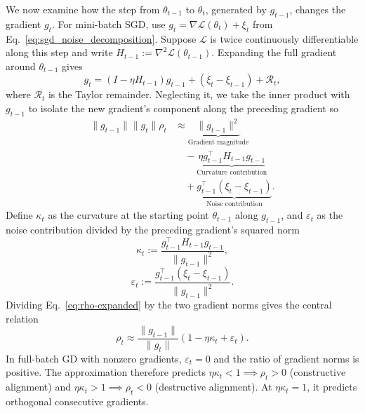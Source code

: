 We now examine how the step from $\theta_{t-1}$ to $\theta_t$, generated by $g_{t-1}$, changes the gradient $g_t$. For mini-batch SGD, use $g_t=\nabla\mathcal L(\theta_t)+\xi_t$ from Eq.~\eqref{eq:sgd_noise_decomposition}. Suppose $\mathcal L$ is twice continuously differentiable along this step and write $H_{t-1}:=\nabla^2\mathcal L(\theta_{t-1})$. Expanding the full gradient around $\theta_{t-1}$ gives
\begin{equation}
  g_t=(I-\eta H_{t-1})g_{t-1}+(\xi_t-\xi_{t-1})+\mathcal R_t,
  \label{eq:gradient-evolution}
\end{equation}
where $\mathcal R_t$ is the Taylor remainder. Neglecting it, we take the inner product with $g_{t-1}$ to isolate the new gradient's component along the preceding gradient so
\begin{equation}
\begin{aligned}
\|g_{t-1}\|\|g_t\|\rho_t
 &\approx\underbrace{\|g_{t-1}\|^2}_{\text{Gradient magnitude}}\\
 &\quad-\underbrace{\eta g_{t-1}^{\top}H_{t-1}g_{t-1}}_{\text{Curvature contribution}}\\
 &\quad+\underbrace{g_{t-1}^{\top}(\xi_t-\xi_{t-1})}_{\text{Noise contribution}}.
\end{aligned}
\label{eq:rho-expanded}
\end{equation}
Define $\kappa_t$ as the curvature at the starting point $\theta_{t-1}$ along $g_{t-1}$, and $\varepsilon_t$ as the noise contribution divided by the preceding gradient's squared norm
\begin{equation}
  \kappa_t:=\frac{g_{t-1}^\top H_{t-1}g_{t-1}}{\|g_{t-1}\|^2},
  \label{eq:kappa}
\end{equation}
\begin{equation}
  \varepsilon_t:=
  \frac{g_{t-1}^\top(\xi_t-\xi_{t-1})}{\|g_{t-1}\|^2}.
  \label{eq:epsilon}
\end{equation}
Dividing Eq.~\eqref{eq:rho-expanded} by the two gradient norms gives the central relation
\begin{equation}
  \boxed{\rho_t\approx\frac{\|g_{t-1}\|}{\|g_t\|}
                   (1-\eta\kappa_t+\varepsilon_t).}
  \label{eq:rho-normalized}
\end{equation}
In full-batch GD with nonzero gradients, $\varepsilon_t=0$ and the ratio of gradient norms is positive. The approximation therefore predicts $\eta\kappa_t<1 \implies \rho_t>0$ (constructive alignment) and $\eta\kappa_t>1 \implies \rho_t<0$ (destructive alignment). At $\eta\kappa_t=1$, it predicts orthogonal consecutive gradients.

